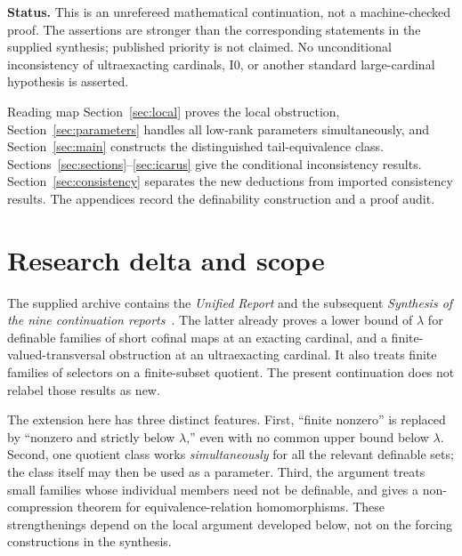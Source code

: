 \documentclass[11pt,letterpaper]{article}
\theoremstyle{definition}
\numberwithin{equation}{section}
\newcommand{\Izero}{\mathrm{I0}}
\begin{document}
{\small\color{Muted}\textbf{Status.} This is an unrefereed mathematical continuation, not a machine-checked proof. The assertions are stronger than the corresponding statements in the supplied synthesis; published priority is not claimed. No unconditional inconsistency of ultraexacting cardinals, $\Izero$, or another standard large-cardinal hypothesis is asserted.}

\newpage
\tableofcontents
\vspace{10pt}
\begin{assessment}{Reading map}
Section~\ref{sec:local} proves the local obstruction, Section~\ref{sec:parameters} handles all low-rank parameters simultaneously, and Section~\ref{sec:main} constructs the distinguished tail-equivalence class. Sections~\ref{sec:sections}--\ref{sec:icarus} give the conditional inconsistency results. Section~\ref{sec:consistency} separates the new deductions from imported consistency results. The appendices record the definability construction and a proof audit.
\end{assessment}

\newpage
\section{Research delta and scope}\label{sec:delta}

The supplied archive contains the \emph{Unified Report} and the subsequent \emph{Synthesis of the nine continuation reports}~\cite{plan,synthesis}. The latter already proves a lower bound of $\lambda$ for definable families of short cofinal maps at an exacting cardinal, and a finite-valued-transversal obstruction at an ultraexacting cardinal. It also treats finite families of selectors on a finite-subset quotient. The present continuation does not relabel those results as new.

The extension here has three distinct features. First, ``finite nonzero'' is replaced by ``nonzero and strictly below $\lambda$,'' even with no common upper bound below $\lambda$. Second, one quotient class works \emph{simultaneously} for all the relevant definable sets; the class itself may then be used as a parameter. Third, the argument treats small families whose individual members need not be definable, and gives a non-compression theorem for equivalence-relation homomorphisms. These strengthenings depend on the local argument developed below, not on the forcing constructions in the synthesis.
\end{document}
